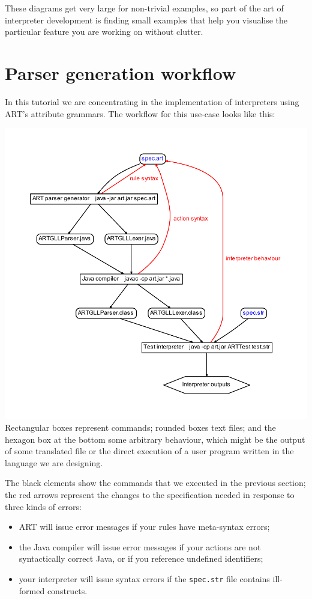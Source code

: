 These diagrams get very large for non-trivial examples, so part of the art of interpreter development is finding small examples that help you visualise the particular feature you are working on without clutter.
\clearpage
\section{Parser generation workflow}
In this tutorial we are concentrating in the implementation of interpreters using ART's attribute grammars. The workflow for this use-case looks like this:

\vspace*{-1cm}\hspace*{-2.2cm}\includegraphics{artflow.pdf}\vspace*{-1cm}
Rectangular boxes represent commands; rounded boxes text files; and the hexagon box at the bottom some arbitrary behaviour, which might be the output of some translated file or the direct execution of a user program written in the language we are designing.

The black elements show the commands that we executed in the previous section; the red arrows represent the changes to the specification needed in response to three kinds of errors:
\begin{itemize}
\item ART will issue error messages if your rules have meta-syntax errors;
\item the Java compiler will issue error messages if your actions are not syntactically correct Java, or if you reference undefined identifiers;
\item your interpreter will issue syntax errors if the {\tt spec.str} file contains ill-formed constructs.
\end{itemize}


